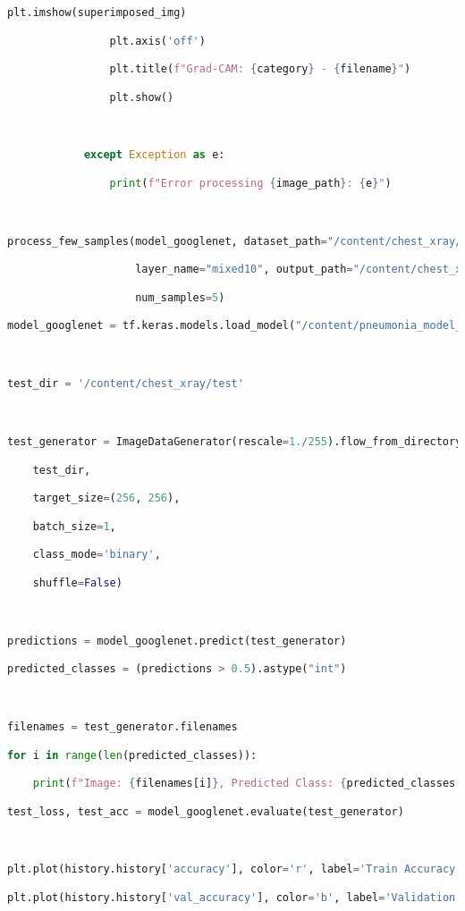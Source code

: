 \documentclass{article}
\begin{document}
\begin{lstlisting}[style=mystyle,language=Python]
                plt.imshow(superimposed_img)

                plt.axis('off')

                plt.title(f"Grad-CAM: {category} - {filename}")

                plt.show()



            except Exception as e:

                print(f"Error processing {image_path}: {e}")



process_few_samples(model_googlenet, dataset_path="/content/chest_xray/train",

                    layer_name="mixed10", output_path="/content/chest_xray_gradcam_googlenet",

                    num_samples=5)

model_googlenet = tf.keras.models.load_model("/content/pneumonia_model_googlenet.h5")



test_dir = '/content/chest_xray/test'



test_generator = ImageDataGenerator(rescale=1./255).flow_from_directory(

    test_dir,

    target_size=(256, 256),

    batch_size=1,

    class_mode='binary',

    shuffle=False)



predictions = model_googlenet.predict(test_generator)

predicted_classes = (predictions > 0.5).astype("int")



filenames = test_generator.filenames

for i in range(len(predicted_classes)):

    print(f"Image: {filenames[i]}, Predicted Class: {predicted_classes[i]}")

test_loss, test_acc = model_googlenet.evaluate(test_generator)



plt.plot(history.history['accuracy'], color='r', label='Train Accuracy')

plt.plot(history.history['val_accuracy'], color='b', label='Validation Accuracy')




\end{lstlisting}
\end{document}
